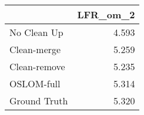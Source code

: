 \begin{tabular}{lr}
\toprule
{} & LFR_om_2 \\
\midrule
No Clean Up  &    4.593 \\
Clean-merge  &    5.259 \\
Clean-remove &    5.235 \\
OSLOM-full   &    5.314 \\
Ground Truth &    5.320 \\
\bottomrule
\end{tabular}
